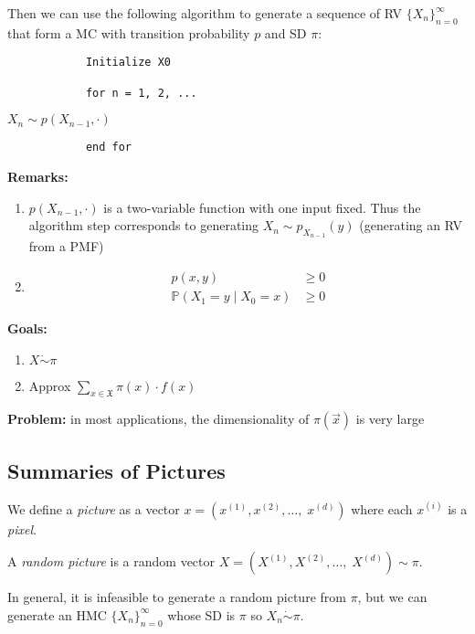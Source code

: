 \documentclass[12pt]{article}
\renewcommand{\P}{\mathbb{P}}
\newcommand{\mfX}{\mathfrak{X}}
\begin{document}
        Then we can use the following algorithm to generate a sequence of RV $\{X_n\}_{n=0}^\infty$ that form a MC with transition probability $p$ and SD $\pi$: 
        \begin{verbatim}
            Initialize X0

            for n = 1, 2, ...
        \end{verbatim}
        \hspace*{2in} $X_n \sim p(X_{n-1}, \cdot)$
        \begin{verbatim}
            end for
        \end{verbatim}

        \textbf{Remarks:}
        \begin{enumerate}
            \item $p(X_{n-1}, \cdot)$ is a two-variable function with one input fixed. Thus the algorithm step corresponds to generating $X_n \sim p_{X_{n-1}}(y)$ (generating an RV from a PMF)
            \item 
            \begin{align*}
                p(x, y) &\geq 0\\
                \P(X_1 = y \; | \; X_0 = x) &\geq 0
            \end{align*}
        \end{enumerate}

        \textbf{Goals:}
        \begin{enumerate}
            \item $X \dot \sim \pi$
            \item Approx $\sum_{x\in \mfX} \pi(x) \cdot f(x)$
        \end{enumerate}

        \textbf{Problem:} in most applications, the dimensionality of $\pi(\vec x)$ is very large 

    \subsection{Summaries of Pictures}
        We define a \emph{picture} as a vector $x = (x^{(1)}, x^{(2)}, \dots,\; x^{(d)})$ where each $x^{(i)}$ is a \emph{pixel}. 

        A \emph{random picture} is a random vector $X = (X^{(1)}, X^{(2)}, \dots,\; X^{(d)}) \sim \pi$. 

        In general, it is infeasible to generate a random picture from $\pi$, but we can generate an HMC $\{X_n\}_{n=0}^\infty$ whose SD is $\pi$ so $X_n \dot \sim \pi$.
\end{document}
